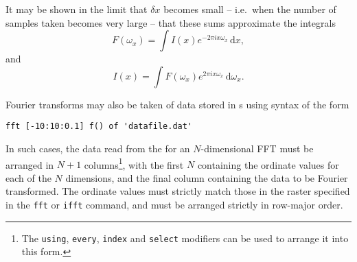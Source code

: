It may be shown in the limit that $\delta x$ becomes small -- i.e.\ when the
number of samples taken becomes very large -- that these sums approximate the
integrals
\begin{equation}
F(\omega_x) = \int I(x) e^{-2\pi ix\omega_x} \,\mathrm{d}x ,
\end{equation}
\noindent and
\begin{equation}
I(x) = \int F(\omega_x) e^{ 2\pi ix\omega_x} \,\mathrm{d}\omega_x .
\end{equation}

Fourier transforms may also be taken of data stored in \datafile s using syntax
of the form
\begin{verbatim}
fft [-10:10:0.1] f() of 'datafile.dat'
\end{verbatim}

\noindent In such cases, the data read from the \datafile for an
$N$-dimensional FFT must be arranged in $N+1$ columns\footnote{The {\tt using},
{\tt every}, {\tt index} and {\tt select} modifiers can be used to arrange it
into this form.}, with the first $N$ containing the ordinate values for each of
the $N$ dimensions, and the final column containing the data to be Fourier
transformed. The ordinate values must strictly match those in the raster
specified in the {\tt fft} or {\tt ifft} command, and must be arranged strictly
in row-major order.

